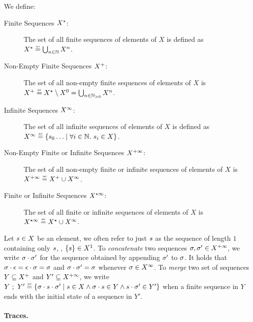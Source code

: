 We define:
\begin{description}
  \item[Finite Sequences $X^\star$:] The set of all finite sequences of elements of $X$ is defined as $\retrievefiniteoremptytraces{X} \defeq \bigsetjoin_{n \in \N} X^n$.
  \item[Non-Empty Finite Sequences $X^+$:] The set of all non-empty finite sequences of elements of $X$ is $\retrievefinitetraces{X} \defeq \retrievefiniteoremptytraces{X} \setminus X^0 = \bigsetjoin_{n \in \Nposstrict} X^n$.
  \item[Infinite Sequences $X^\infty$:] The set of all infinite sequences of elements of $X$ is defined as  $\retrieveinfinitetraces{X} \defeq \setdef{\defstate_0 \dots}{\forall i \in \N.\spacer \defstate_i \in X}$.
  \item[Non-Empty Finite or Infinite Sequences $X^{+\infty}$:] The set of all non-empty finite or infinite sequences of elements of $X$ is $\retrievefiniteinfinitetraces{X} \defeq \retrievefinitetraces{X} \cup \retrieveinfinitetraces{X}$.
  \item[Finite or Infinite Sequences $X^{\star\infty}$:] The set of all finite or infinite sequences of elements of $X$ is $\retrievefiniteoremptyinfinitetraces{X} \defeq \retrievefiniteoremptytraces{X} \cup \retrieveinfinitetraces{X}$.
\end{description}

Let $s\in X$ be an element, we often refer to just $s$ as the sequence of length $1$ containing only $s$, \ie, $\{s\} \in X^1$.
To \emph{concatenate} two sequences $\sigma, \sigma' \in X^{+\infty}$, we write ${\sigma}\cdot{\sigma'}$ for the sequence obtained by appending $\sigma'$ to $\sigma$. It holds that ${\sigma}\cdot{\epsilon} = {\epsilon}\cdot{\sigma} = \sigma$ and ${\sigma}\cdot{\sigma'} = \sigma$ whenever $\sigma \in X^\infty$. To \emph{merge} two set of sequences $Y \subseteq X^+$ and $Y' \subseteq X^{+\infty}$, we write $\mergesequences{Y}{Y'} \defeq \setdef{\concat{\defseq}{\concat{\defstate}{\defseq'}}}{\defstate \in X \land \concat{\defseq}{\defstate} \in Y \land \concat{\defstate}{\defseq'} \in Y'}$ when a finite sequence in $Y$ ends with the initial state of a sequence in $Y'$.

\paragraph{Traces.}

